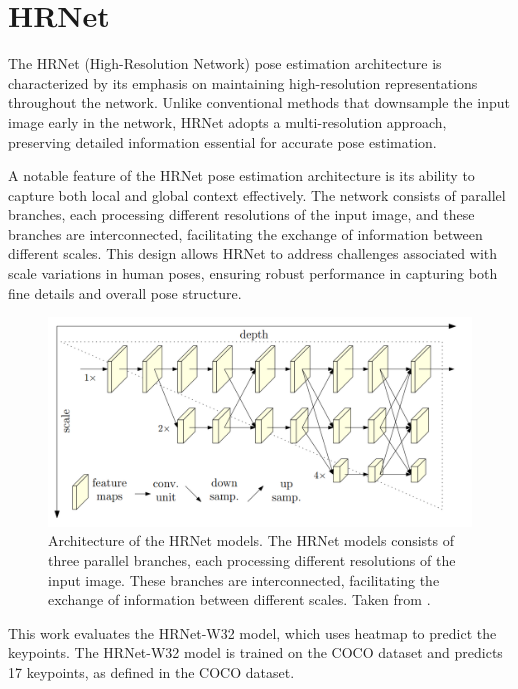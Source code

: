 \section{HRNet}
\label{hrnet}

The HRNet (High-Resolution Network) \cite{hrnet} pose estimation architecture is characterized by its emphasis on maintaining high-resolution representations throughout the network. Unlike conventional methods that downsample the input image early in the network, HRNet adopts a multi-resolution approach, preserving detailed information essential for accurate pose estimation.

A notable feature of the HRNet pose estimation architecture is its ability to capture both local and global context effectively. The network consists of parallel branches, each processing different resolutions of the input image, and these branches are interconnected, facilitating the exchange of information between different scales. This design allows HRNet to address challenges associated with scale variations in human poses, ensuring robust performance in capturing both fine details and overall pose structure.

\begin{figure}[htbp]
    \centering
    \includegraphics[width=\textwidth]{obrazky-figures/hrnet_architecture.png}
    \caption{Architecture of the HRNet models. The HRNet models consists of three parallel branches, each processing different resolutions of the input image. These branches are interconnected, facilitating the exchange of information between different scales. Taken from \cite{hrnet}.}
    \label{fig:hrnet_architecture}
\end{figure}

This work evaluates the HRNet-W32 model, which uses heatmap to predict the keypoints. The HRNet-W32 model is trained on the COCO dataset and predicts 17 keypoints, as defined in the COCO dataset.


